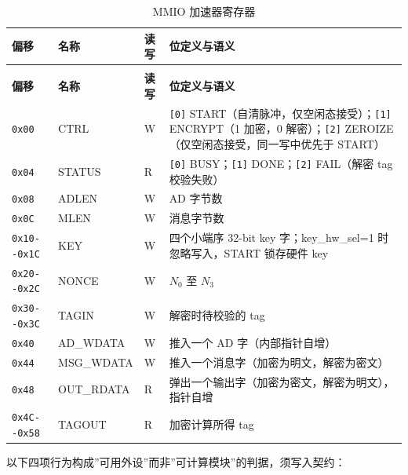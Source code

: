 {\small
\setlength{\tabcolsep}{4pt}
\renewcommand{\thetable}{2-7}
\begin{longtable}{@{}>{\raggedright\arraybackslash}p{}>{\raggedright\arraybackslash}p{}>{\raggedright\arraybackslash}p{}>{\raggedright\arraybackslash}p{}@{}}
\caption{MMIO 加速器寄存器}\label{tab:2-7}\\
\toprule
\textbf{偏移} & \textbf{名称} & \textbf{读写} & \textbf{位定义与语义} \\
\midrule
\endfirsthead
\multicolumn{4}{@{}l}{\footnotesize 续表 2-7}\\
\toprule
\textbf{偏移} & \textbf{名称} & \textbf{读写} & \textbf{位定义与语义} \\
\midrule
\endhead
\texttt{0x00} & CTRL & W & \texttt{[0]} START（自清脉冲，仅空闲态接受）；\texttt{[1]} ENCRYPT（1 加密，0 解密）；\texttt{[2]} ZEROIZE（仅空闲态接受，同一写中优先于 START） \\
\texttt{0x04} & STATUS & R & \texttt{[0]} BUSY；\texttt{[1]} DONE；\texttt{[2]} FAIL（解密 tag 校验失败） \\
\texttt{0x08} & ADLEN & W & AD 字节数 \\
\texttt{0x0C} & MLEN & W & 消息字节数 \\
\texttt{0x10-\allowbreak{}-\allowbreak{}0x1C} & KEY & W & 四个小端序 32-bit key 字；key\_hw\_sel=1 时忽略写入，START 锁存硬件 key \\
\texttt{0x20-\allowbreak{}-\allowbreak{}0x2C} & NONCE & W & $N_0$ 至 $N_3$ \\
\texttt{0x30-\allowbreak{}-\allowbreak{}0x3C} & TAGIN & W & 解密时待校验的 tag \\
\texttt{0x40} & AD\_\allowbreak{}WDATA & W & 推入一个 AD 字（内部指针自增） \\
\texttt{0x44} & MSG\_\allowbreak{}WDATA & W & 推入一个消息字（加密为明文，解密为密文） \\
\texttt{0x48} & OUT\_\allowbreak{}RDATA & R & 弹出一个输出字（加密为密文，解密为明文），指针自增 \\
\texttt{0x4C-\allowbreak{}-\allowbreak{}0x58} & TAGOUT & R & 加密计算所得 tag \\
\bottomrule
\end{longtable}
}

以下四项行为构成''可用外设''而非''可计算模块''的判据，须写入契约：

